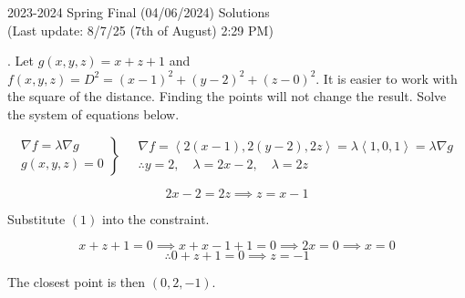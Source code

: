 \documentclass{article}
\begin{document}
\newpage

\begin{center}
2023-2024 Spring Final (04/06/2024) Solutions\\
(Last update: 8/7/25 (7th of August) 2:29 PM)
\end{center}

. Let $g(x,y,z)=x+z+1$ and $f(x,y,z)=D^2=(x-1)^2+(y-2)^2+(z-0)^2$. It is easier to work with the square of the distance. Finding the points will not change the result. Solve the system of equations below.

\[
\left.
\begin{array}{l}
\displaystyle\nabla f=\lambda\nabla g \\
\displaystyle g(x,y,z)=0
\end{array}
\right\}\quad
\begin{array}{l}
\nabla f=\left\langle2(x-1),2(y-2),2z\right\rangle=\lambda\left\langle1,0,1\right\rangle=\lambda\nabla g\\\therefore y=2, \quad\lambda=2x-2,\quad\lambda=2z
\end{array}
\]

\begin{equation}2x-2=2z\implies z=x-1\end{equation}

\hfill

\noindent Substitute $(1)$ into the constraint.

\[x+z+1=0\implies x+x-1+1=0\implies2x=0\implies x=0\]
\[\therefore 0+z+1=0\implies z=-1\]

\hfill

\noindent The closest point is then $\boxed{(0,2,-1)}$.

\hfill
\end{document}
